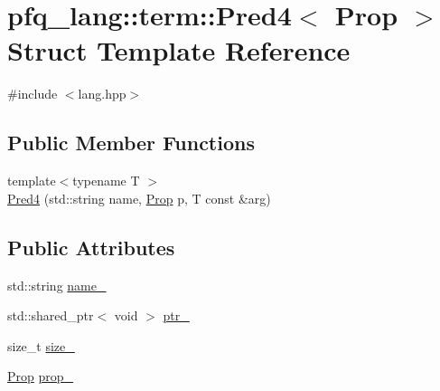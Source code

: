 \hypertarget{structpfq__lang_1_1term_1_1Pred4}{\section{pfq\+\_\+lang\+:\+:term\+:\+:Pred4$<$ Prop $>$ Struct Template Reference}
\label{structpfq__lang_1_1term_1_1Pred4}
}


{\ttfamily \#include $<$lang.\+hpp$>$}

\subsection*{Public Member Functions}
\begin{DoxyCompactItemize}
\item 
{\footnotesize template$<$typename T $>$ }\\\hyperlink{structpfq__lang_1_1term_1_1Pred4_abf90853e9f4772dd71304ed27efce869}{Pred4} (std\+::string name, \hyperlink{structpfq__lang_1_1term_1_1Prop}{Prop} p, T const \&arg)
\end{DoxyCompactItemize}
\subsection*{Public Attributes}
\begin{DoxyCompactItemize}
\item 
std\+::string \hyperlink{structpfq__lang_1_1term_1_1Pred4_a57f3123042c7ab4bba88d975449624b5}{name\+\_\+}
\item 
std\+::shared\+\_\+ptr$<$ void $>$ \hyperlink{structpfq__lang_1_1term_1_1Pred4_abb2d1d1471c132aa44cb302ff97cb5d3}{ptr\+\_\+}
\item 
size\+\_\+t \hyperlink{structpfq__lang_1_1term_1_1Pred4_a8b048607b50bc442cf98b31987df7a53}{size\+\_\+}
\item 
\hyperlink{structpfq__lang_1_1term_1_1Prop}{Prop} \hyperlink{structpfq__lang_1_1term_1_1Pred4_ab5f3d36392d98a2549b8e517f8919163}{prop\+\_\+}
\end{DoxyCompactItemize}


